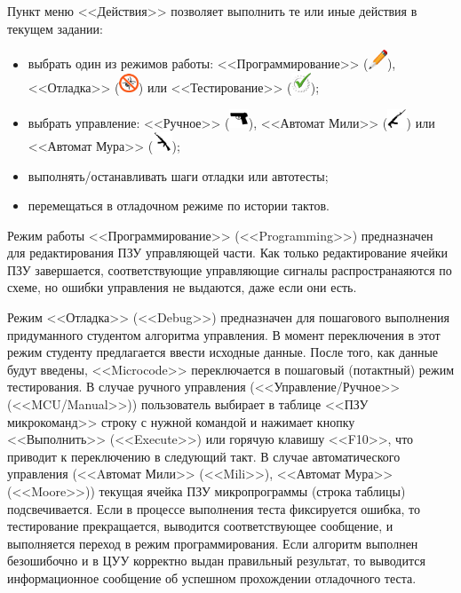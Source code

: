 Пункт меню <<Действия>> позволяет выполнить те или иные действия в текущем задании:
\begin{itemize}
    \item выбрать один из режимов работы: <<Программирование>> (\includegraphics[width=16pt]{fig/microcode/image/programming.png}), <<Отладка>> (\includegraphics[width=16pt]{fig/microcode/image/debug.png}) или <<Тестирование>> (\includegraphics[width=16pt]{fig/microcode/image/autotest.png});
    \item выбрать управление: <<Ручное>> (\includegraphics[width=16pt]{fig/microcode/image/manualgun.png}), 
                              <<Автомат Мили>> (\includegraphics[width=16pt]{fig/microcode/image/miligun.png})
                              или <<Автомат Мура>> (\includegraphics[width=16pt]{fig/microcode/image/mooregun.png});
    \item выполнять/останавливать шаги отладки или автотесты;
    \item перемещаться в отладочном режиме по истории тактов.
\end{itemize}

Режим работы <<Программирование>> (<<Programming>>) предназначен для редактирования ПЗУ управляющей части. Как только редактирование ячейки ПЗУ завершается, соответствующие управляющие сигналы распространаяются по схеме, но ошибки управления не выдаются, даже если они есть.

Режим <<Отладка>> (<<Debug>>) предназначен для пошагового выполнения придуманного студентом алгоритма управления. В момент переключения в этот режим студенту предлагается ввести исходные данные. После того, как данные будут введены, <<Microcode>> переключается в пошаговый (потактный) режим тестирования. В случае ручного управления (<<Управление/Ручное>> (<<MCU/Manual>>)) пользователь выбирает в таблице <<ПЗУ микрокоманд>> строку с нужной командой и нажимает кнопку <<Выполнить>> (<<Execute>>) или горячую клавишу <<F10>>, что приводит к переключению в следующий такт. В случае автоматического управления (<<Aвтомат Мили>> (<<Mili>>), <<Автомат Мура>> (<<Moore>>)) текущая ячейка ПЗУ микропрограммы (строка таблицы) подсвечивается. Если в процессе выполнения теста фиксируется ошибка, то тестирование прекращается, выводится соответствующее сообщение, и выполняется переход в режим программирования. Если алгоритм выполнен безошибочно и в ЦУУ корректно выдан правильный результат, то выводится информационное сообщение об успешном прохождении отладочного теста.

